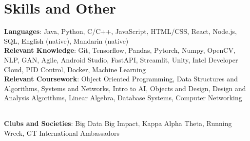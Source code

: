 \documentclass[letterpaper,11pt]{article}
\begin{document}
\section{Skills and Other}
 \begin{itemize}[leftmargin=0.15in, label={}]
    \small{\item{
     \textbf{Languages}{: Java, Python, C/C++, JavaScript, HTML/CSS, React, Node.js, SQL, English (native), Mandarin (native)} \\
     \textbf{Relevant Knowledge}{: Git, Tensorflow, Pandas, Pytorch, Numpy, OpenCV, NLP, GAN, Agile, Android Studio, FastAPI, Streamlit, Unity, Intel Developer Cloud, PID Control, Docker, Machine Learning} \\
     \textbf{Relevant Coursework}{: Object Oriented Programming, Data Structures and Algorithms, Systems and Networks, Intro to AI, Objects and Design, Design and Analysis Algorithms, Linear Algebra, Database Systems, Computer Networking}}}\\
     \textbf{Clubs and Societies}{: Big Data Big Impact, Kappa Alpha Theta, Running Wreck, GT International Ambassadors}
 \end{itemize}


\end{document}
